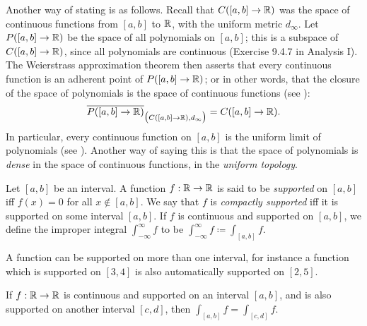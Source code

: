 \begin{note}
  Another way of stating  is as follows.
  Recall that \(C([a, b] \to \mathbb{R})\) was the space of continuous functions from \([a, b]\) to \(\mathbb{R}\), with the uniform metric \(d_\infty\).
  Let \(P([a, b] \to \mathbb{R})\) be the space of all polynomials on \([a, b]\);
  this is a subspace of \(C([a, b] \to \mathbb{R})\), since all polynomials are continuous (Exercise 9.4.7 in Analysis I).
  The Weierstrass approximation theorem then asserts that every continuous function is an adherent point of \(P([a, b] \to \mathbb{R})\);
  or in other words, that the closure of the space of polynomials is the space of continuous functions (see ):
  \[
    \overline{P([a, b] \to \mathbb{R})}_{\big(C([a, b] \to \mathbb{R}), d_\infty\big)} = C([a, b] \to \mathbb{R}).
  \]
  In particular, every continuous function on \([a, b]\) is the uniform limit of polynomials (see ).
  Another way of saying this is that the space of polynomials is \emph{dense} in the space of continuous functions, in the \emph{uniform topology}.
\end{note}

\begin{defn}\label{ii:3.8.4}
  Let \([a, b]\) be an interval.
  A function \(f : \mathbb{R} \to \mathbb{R}\) is said to be \emph{supported} on \([a, b]\) iff \(f(x) = 0\) for all \(x \notin [a, b]\).
  We say that \(f\) is \emph{compactly supported} iff it is supported on some interval \([a, b]\).
  If \(f\) is continuous and supported on \([a, b]\), we define the improper integral \(\int_{-\infty}^\infty f\) to be \(\int_{-\infty}^\infty f \coloneqq \int_{[a, b]} f\).
\end{defn}

\begin{note}
  A function can be supported on more than one interval, for instance a function which is supported on \([3, 4]\) is also automatically supported on \([2, 5]\).
\end{note}

\begin{lem}\label{ii:3.8.5}
  If \(f : \mathbb{R} \to \mathbb{R}\) is continuous and supported on an interval \([a, b]\), and is also supported on another interval \([c, d]\), then \(\int_{[a, b]} f = \int_{[c, d]} f\).
\end{lem}

